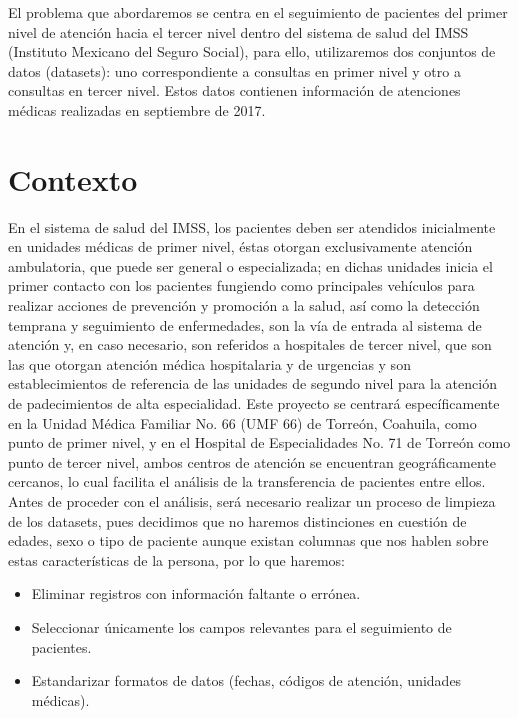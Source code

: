 \documentclass[10pt]{article}
\begin{document}
    El problema que abordaremos se centra en el seguimiento de pacientes del primer nivel de atención hacia el tercer nivel dentro del sistema de salud del IMSS (Instituto Mexicano del Seguro Social), para ello, utilizaremos dos conjuntos de datos (datasets): uno correspondiente a consultas en primer nivel y otro a consultas en tercer nivel. Estos datos contienen información de atenciones médicas realizadas en septiembre de 2017.

	\section{Contexto}
	En el sistema de salud del IMSS, los pacientes deben ser atendidos inicialmente en unidades médicas de primer nivel, éstas otorgan exclusivamente atención ambulatoria, que puede ser general o especializada; en dichas unidades inicia el primer contacto con los pacientes fungiendo como principales vehículos para realizar acciones de prevención y promoción a la salud, así como la detección temprana y seguimiento de enfermedades, son la vía de entrada al sistema de atención y, en caso necesario, son referidos a hospitales de tercer nivel, que son las que otorgan atención médica hospitalaria y de urgencias y son establecimientos de referencia de las unidades de segundo nivel para la atención de padecimientos de alta especialidad.
    Este proyecto se centrará específicamente en la Unidad Médica Familiar No. 66 (UMF 66) de Torreón, Coahuila, como punto de primer nivel, y en el Hospital de Especialidades No. 71 de Torreón como punto de tercer nivel, ambos centros de atención se encuentran geográficamente cercanos, lo cual facilita el análisis de la transferencia de pacientes entre ellos.
    Antes de proceder con el análisis, será necesario realizar un proceso de limpieza de los datasets, pues decidimos que no haremos distinciones en cuestión de edades, sexo o tipo de paciente aunque existan columnas que nos hablen sobre estas características de la persona, por lo que haremos:
    \begin{itemize}
        \item Eliminar registros con información faltante o errónea.
        \item Seleccionar únicamente los campos relevantes para el seguimiento de pacientes.
        \item Estandarizar formatos de datos (fechas, códigos de atención, unidades médicas). \\
    \end{itemize}
    
\end{document}
